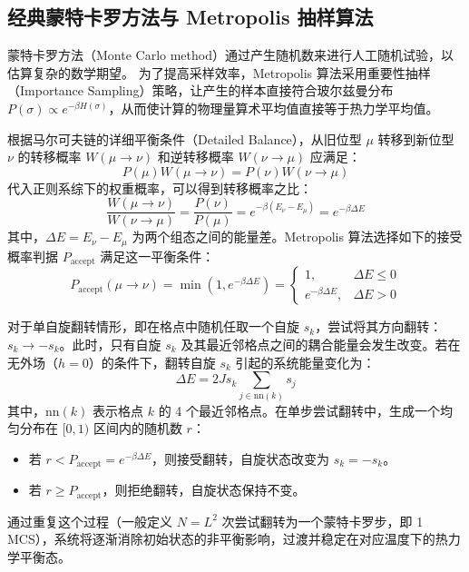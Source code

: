 \documentclass[11pt]{article}
\begin{document}
\subsection{经典蒙特卡罗方法与 Metropolis 抽样算法}
蒙特卡罗方法（Monte Carlo method）通过产生随机数来进行人工随机试验，以估算复杂的数学期望。
为了提高采样效率，Metropolis 算法采用重要性抽样（Importance Sampling）策略，让产生的样本直接符合玻尔兹曼分布 $P(\sigma) \propto e^{-\beta H(\sigma)}$，从而使计算的物理量算术平均值直接等于热力学平均值。

根据马尔可夫链的详细平衡条件（Detailed Balance），从旧位型 $\mu$ 转移到新位型 $\nu$ 的转移概率 $W(\mu \to \nu)$ 和逆转移概率 $W(\nu \to \mu)$ 应满足：
\begin{equation}
    P(\mu) W(\mu \to \nu) = P(\nu) W(\nu \to \mu)
\end{equation}
代入正则系综下的权重概率，可以得到转移概率之比：
\begin{equation}
    \frac{W(\mu \to \nu)}{W(\nu \to \mu)} = \frac{P(\nu)}{P(\mu)} = e^{-\beta (E_\nu - E_\mu)} = e^{-\beta \Delta E}
\end{equation}
其中，$\Delta E = E_\nu - E_\mu$ 为两个组态之间的能量差。Metropolis 算法选择如下的接受概率判据 $P_{\text{accept}}$ 满足这一平衡条件：
\begin{equation}
    P_{\text{accept}}(\mu \to \nu) = \min\left(1, e^{-\beta \Delta E}\right) = \begin{cases}
        1, & \Delta E \le 0 \\
        e^{-\beta \Delta E}, & \Delta E > 0
    \end{cases}
\end{equation}

对于单自旋翻转情形，即在格点中随机任取一个自旋 $s_k$，尝试将其方向翻转：$s_k \to -s_k$。此时，只有自旋 $s_k$ 及其最近邻格点之间的耦合能量会发生改变。若在无外场（$h=0$）的条件下，翻转自旋 $s_k$ 引起的系统能量变化为：
\begin{equation}
    \Delta E = 2 J s_k \sum_{j \in \text{nn}(k)} s_j
\end{equation}
其中，$\text{nn}(k)$ 表示格点 $k$ 的 4 个最近邻格点。在单步尝试翻转中，生成一个均匀分布在 $[0, 1)$ 区间内的随机数 $r$：
\begin{itemize}
    \item 若 $r < P_{\text{accept}} = e^{-\beta \Delta E}$，则接受翻转，自旋状态改变为 $s_k = -s_k$。
    \item 若 $r \ge P_{\text{accept}}$，则拒绝翻转，自旋状态保持不变。
\end{itemize}
通过重复这个过程（一般定义 $N = L^2$ 次尝试翻转为一个蒙特卡罗步，即 1 MCS），系统将逐渐消除初始状态的非平衡影响，过渡并稳定在对应温度下的热力学平衡态。
\end{document}
